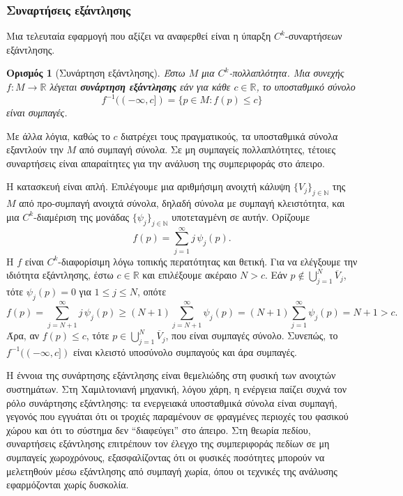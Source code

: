 \documentclass[11pt,a4paper,twoside,openright]{book}
\newtheorem{definition}[lemma]{Ορισμός}
\begin{document}
\subsubsection{Συναρτήσεις εξάντλησης}
	\label{sec:exhaustion-functions}

Μια τελευταία εφαρμογή που αξίζει να αναφερθεί είναι η ύπαρξη $C^k$-συναρτήσεων εξάντλησης.

\begin{definition}[Συνάρτηση εξάντλησης]\label{def:exhaustion-function}
Έστω $M$ μια $C^k$-πολλαπλότητα. Μια συνεχής $f: M \to \mathbb{R}$ λέγεται \textbf{συνάρτηση εξάντλησης} εάν για κάθε $c \in \mathbb{R}$, το υποσταθμικό σύνολο
\begin{equation*}
f^{-1}((-\infty, c]) = \{ p \in M : f(p) \le c \}
\end{equation*}
είναι συμπαγές.
\end{definition}

\noindent
Με άλλα λόγια, καθώς το $c$ διατρέχει τους πραγματικούς, τα υποσταθμικά σύνολα εξαντλούν την $M$ από συμπαγή σύνολα. Σε μη συμπαγείς πολλαπλότητες, τέτοιες συναρτήσεις είναι απαραίτητες για την ανάλυση της συμπεριφοράς στο άπειρο.

Η κατασκευή είναι απλή. Επιλέγουμε μια αριθμήσιμη ανοιχτή κάλυψη $\{V_j\}_{j \in \mathbb{N}}$ της $M$ από προ-συμπαγή ανοιχτά σύνολα, δηλαδή σύνολα με συμπαγή κλειστότητα, και μια $C^k$-διαμέριση της μονάδας $\{\psi_j\}_{j \in \mathbb{N}}$ υποτεταγμένη σε αυτήν. Ορίζουμε
\begin{equation*}
f(p) = \sum_{j=1}^\infty j \, \psi_j(p).
\end{equation*}
Η $f$ είναι $C^k$-διαφορίσιμη λόγω τοπικής περατότητας και θετική. Για να ελέγξουμε την ιδιότητα εξάντλησης, έστω $c \in \mathbb{R}$ και επιλέξουμε ακέραιο $N > c$. Εάν $p \notin \bigcup_{j=1}^N \overline{V}_j$, τότε $\psi_j(p) = 0$ για $1 \le j \le N$, οπότε
\begin{equation*}
f(p) = \sum_{j=N+1}^\infty j \, \psi_j(p) \ge (N+1) \sum_{j=N+1}^\infty \psi_j(p) = (N+1) \sum_{j=1}^\infty \psi_j(p) = N+1 > c.
\end{equation*}
Άρα, αν $f(p) \le c$, τότε $p \in \bigcup_{j=1}^N \overline{V}_j$, που είναι συμπαγές σύνολο. Συνεπώς, το $f^{-1}((-\infty, c])$ είναι κλειστό υποσύνολο συμπαγούς και άρα συμπαγές.

Η έννοια της συνάρτησης εξάντλησης είναι θεμελιώδης στη φυσική των ανοιχτών συστημάτων. Στη Χαμιλτονιανή μηχανική, λόγου χάρη, η ενέργεια παίζει συχνά τον ρόλο συνάρτησης εξάντλησης: τα ενεργειακά υποσταθμικά σύνολα είναι συμπαγή, γεγονός που εγγυάται ότι οι τροχιές παραμένουν σε φραγμένες περιοχές του φασικού χώρου και ότι το σύστημα δεν ``διαφεύγει'' στο άπειρο. Στη θεωρία πεδίου, συναρτήσεις εξάντλησης επιτρέπουν τον έλεγχο της συμπεριφοράς πεδίων σε μη συμπαγείς χωροχρόνους, εξασφαλίζοντας ότι οι φυσικές ποσότητες μπορούν να μελετηθούν μέσω εξάντλησης από συμπαγή χωρία, όπου οι τεχνικές της ανάλυσης εφαρμόζονται χωρίς δυσκολία.
\end{document}
